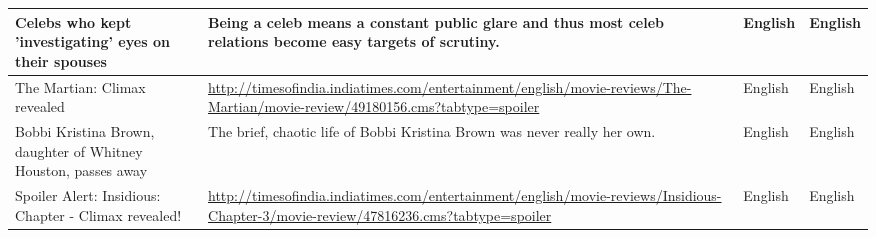 \begin{itemize}
\begin{table}
\begin{center}
\begin{longtable}{|p{3cm}|p{7cm}|p{1.5cm}|p{1.5cm}|}
   Celebs who kept 'investigating' eyes on their spouses&  Being a celeb means a constant public glare and thus most celeb relations become easy targets of scrutiny.&  English&  English\\ \hline
   The Martian: Climax revealed&  \url{http://timesofindia.indiatimes.com/entertainment/english/movie-reviews/The-Martian/movie-review/49180156.cms?tabtype=spoiler} &  English&  English\\ \hline
   Bobbi Kristina Brown, daughter of Whitney Houston, passes away& The brief, chaotic life of Bobbi Kristina Brown was never really her own.&  English&  English\\ \hline
   Spoiler Alert: Insidious: Chapter - Climax revealed!&  \url{http://timesofindia.indiatimes.com/entertainment/english/movie-reviews/Insidious-Chapter-3/movie-review/47816236.cms?tabtype=spoiler}&  English&  English\\ \hline
\end{longtable}
\end{center}
\end{table}


\end{itemize}
